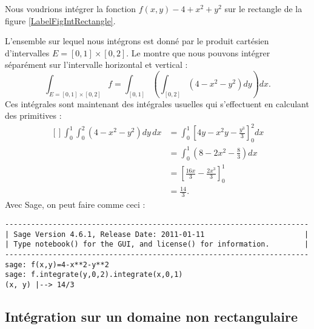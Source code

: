 \begin{example}
    
    Nous voudrions intégrer la fonction $f(x,y)-4+x^2+y^2$ sur le rectangle de la figure \ref{LabelFigIntRectangle}.
    \newcommand{\CaptionFigIntRectangle}{Intégration sur un rectangle.}
    
    L'ensemble sur lequel nous intégrons est donné par le produit cartésien d'intervalles $E=[0,1]\times[0,2]$. Le  montre que nous pouvons intégrer séparément sur l'intervalle horizontal et vertical :
    \begin{equation}
    	\int_{E=[0,1]\times[0,2]}f=\int_{[0,1]}\left( \int_{[0,2]}(4-x^2-y^2)dy \right)dx.
    \end{equation}
    Ces intégrales sont maintenant des intégrales usuelles qui s'effectuent en calculant des primitives :
    \begin{equation}
        \begin{aligned}[]
            \int_0^1\int_0^2(4-x^2-y^2)dy\,dx&=\int_0^1\left[ 4y-x^2y-\frac{ y^3 }{ 3 } \right]_0^2dx\\
            &=\int_0^1(8-2x^2-\frac{ 8 }{ 3 })dx\\
            &=\left[ \frac{ 16x }{ 3 }-\frac{ 2x^3 }{ 3 } \right]_0^1\\
            &=\frac{ 14 }{ 3 }.
        \end{aligned}
    \end{equation}
    Avec Sage, on peut faire comme ceci :

    \begin{verbatim}
----------------------------------------------------------------------
| Sage Version 4.6.1, Release Date: 2011-01-11                       |
| Type notebook() for the GUI, and license() for information.        |
----------------------------------------------------------------------
sage: f(x,y)=4-x**2-y**2                  
sage: f.integrate(y,0,2).integrate(x,0,1)
(x, y) |--> 14/3

    \end{verbatim}

\end{example}

\subsection{Intégration sur un domaine non rectangulaire}
\label{PgRapIntMultFubiniTri}


